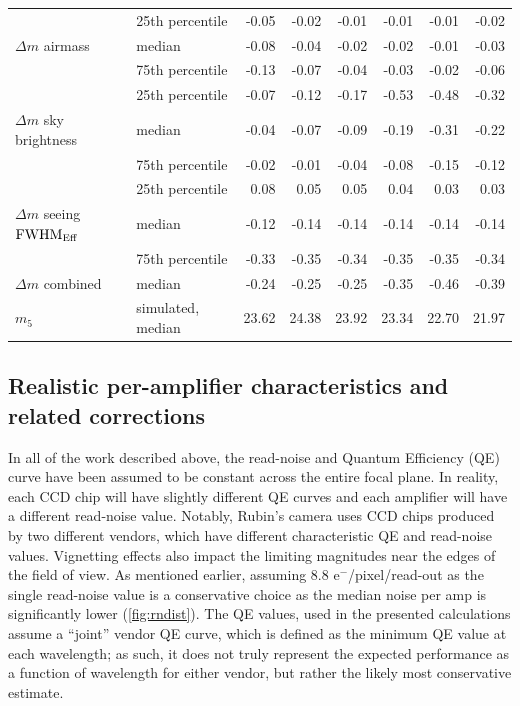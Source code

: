 \documentclass[PST,authoryear,toc]{lsstdoc}
\newcommand{\mf}{\ensuremath{m_5}}
\newcommand{\fwhme}{\ensuremath{{\rm FWHM}_\mathrm{Eff}}}
\begin{document}
\begin{table}
\begin{tabular}{llrrrrrr}
\hline
\hline
 &25th percentile       &   -0.05 &   -0.02 &   -0.01 &   -0.01 &   -0.01 &   -0.02 \\
$\Delta m$ airmass &median                &   -0.08 &   -0.04 &   -0.02 &   -0.02 &   -0.01 &   -0.03 \\
&75th percentile       &   -0.13 &   -0.07 &   -0.04 &   -0.03 &   -0.02 &   -0.06 \\
\hline
 &25th percentile &   -0.07 &   -0.12 &   -0.17 &   -0.53 &   -0.48 &   -0.32 \\
$\Delta m$ sky brightness& median          &   -0.04 &   -0.07 &   -0.09 &   -0.19 &   -0.31 &   -0.22 \\
 &75th percentile &   -0.02 &   -0.01 &   -0.04 &   -0.08 &   -0.15 &   -0.12 \\
\hline
&25th percentile &  0.08 &  0.05 &  0.05 &  0.04 &  0.03 &  0.03 \\
$\Delta m$ seeing \fwhme &median          &   -0.12 &   -0.14 &   -0.14 &   -0.14 &   -0.14 &   -0.14 \\
 &75th percentile &   -0.33 &   -0.35 &   -0.34 &   -0.35 &   -0.35 &   -0.34 \\
 \hline
 $\Delta m$ {combined} &median          &   -0.24 &   -0.25 &   -0.25 &   -0.35 &   -0.46 &   -0.39 \\

\hline
\hline
\mf\ & simulated, median                      &  23.62 &  24.38 &  23.92 &  23.34 &  22.70 &  21.97 \\
\hline

\hline
\end{tabular}
\end{table}

 
 \FloatBarrier


\subsection{Realistic per-amplifier characteristics and related corrections}\label{per-amp}
In all of the work described above, the read-noise and Quantum Efficiency (QE) curve have been assumed to be constant across the entire focal plane. In reality, each CCD chip will have slightly different QE curves and each amplifier will have a different read-noise value. Notably, Rubin's camera uses CCD chips produced by two different vendors, which have different characteristic QE and read-noise values. Vignetting effects also impact the limiting magnitudes near the edges of the field of view.  As mentioned earlier, assuming 8.8 e$^-$/pixel/read-out as the single read-noise value is a conservative choice as the median noise per amp is significantly lower (\autoref{fig:rndist}). The QE values, used in the presented calculations assume a ``joint'' vendor QE curve, which is defined as the minimum QE value at each wavelength; as such, it does not truly represent the expected performance as a function of wavelength for either vendor, but rather the likely most conservative estimate. 
\end{document}
